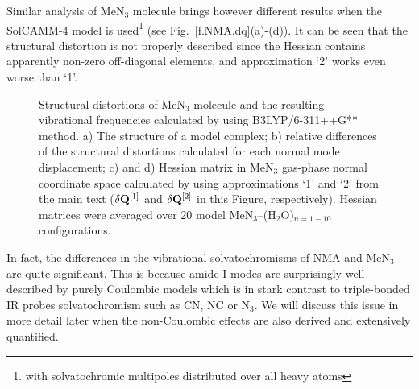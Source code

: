 \documentclass[a4paper,titlepage,twoside,fleqn,12pt]{book}
\begin{document}
\begin{refsection}
Similar analysis of MeN$_3$ molecule brings however different results when the SolCAMM-4 model is
used\footnote{with solvatochromic multipoles distributed over all heavy atoms} 
(see Fig.~\ref{f.NMA.dq}(a)-(d)). It can be seen that
the structural distortion is not properly described since the Hessian contains apparently
non\hyp{}zero off\hyp{}diagonal elements, and approximation `2' works even worse than `1'. 
%
\begin{figure}[ht]
\centering
\setlength\fboxsep{0.4pt}
\setlength\fboxrule{0.5pt}
\caption{Structural distortions of MeN$_3$ molecule and the resulting vibrational
frequencies calculated by using B3LYP/6-311++G** method. 
a) The structure of a model complex; b) relative differences of the
structural distortions
calculated for each normal mode displacement; c) and d) Hessian matrix in MeN$_3$ gas-phase normal coordinate
space calculated by using approximations `1' and `2' from the main text 
($\delta {\bf Q}^{[1]}$ and $\delta {\bf Q}^{[2]}$ in this Figure, respectively).
Hessian matrices were averaged over 20 model MeN$_3$--(H$_2$O)$_{n=1-10}$ configurations.
\label{f.MeN3.dq}}
\end{figure}
%

In fact, the differences in the vibrational solvatochromisms of NMA and MeN$_3$ are quite significant. 
This is because amide I modes are surprisingly well described by purely Coulombic 
models \citep{Blasiak.Lee.Cho.JCP.2013,Blasiak.Cho.JCP.2014,Blasiak.Cho.JCP.2015}
which is in stark contrast to triple\hyp{}bonded IR probes solvatochromism such as 
CN, NC or N$_3$. \citep{Blasiak.Ritchie.Webb.Cho.PCCP.2016,Maj.Ahn.Blasiak.Kwak.Han.Cho.XXX.2016}
We will discuss this issue in more detail later when the non-Coulombic effects 
are also derived and extensively quantified.


\end{refsection}
\end{document}
